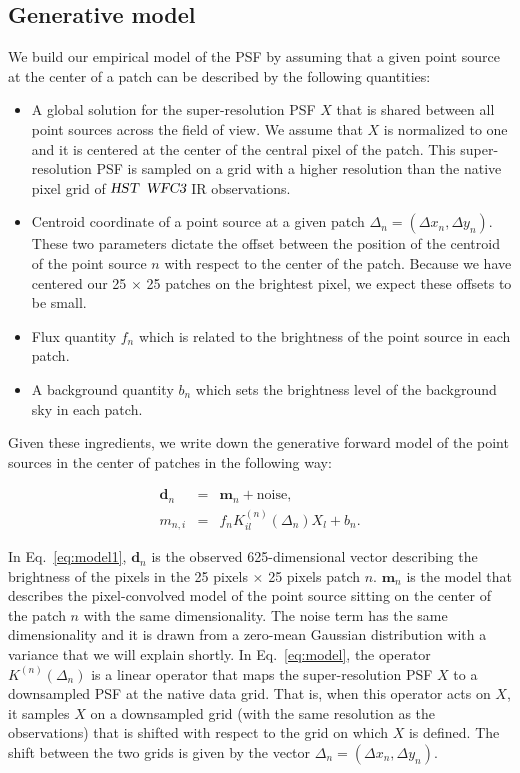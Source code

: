 \subsection{Generative model}

We build our empirical model of the PSF by assuming that a given point source at the center of a patch can be described by 
the following quantities: 

\begin{itemize}
\item A global solution for the super-resolution PSF $X$ that is shared between all point sources across the field of view. We assume 
that $X$ is normalized to one and it is centered at the center of the central pixel of the patch. This super-resolution PSF is sampled on 
a grid with a higher resolution than the native pixel grid of ${\textsl{HST}}$ ${\textsl{WFC3}}$ IR observations.

\item Centroid coordinate of a point source at a given patch $\Delta_n = (\Delta x_n, \Delta y_n)$. 
These two parameters dictate the offset between the position of the centroid of the point source $n$ with 
respect to the center of the patch. Because we have centered our 25 $\times$ 25 patches on the brightest pixel, we expect these offsets to be small.

\item Flux quantity $f_n$ which is related to the brightness of the point source in each patch.

\item A background quantity $b_n$ which sets the brightness level of the background sky in each patch.

\end{itemize}

Given these ingredients, we write down the generative forward model of the point sources in the center of patches in the following way:

\begin{eqnarray} \mathbf{d}_{n} &=& \mathbf{m}_{n} + \mathrm{noise}, \label{eq:model1} \\
       m_{n,i} &=& f_{n}K^{(n)}_{il} (\Delta_n) X_{l} + b_{n}. 
\label{eq:model}
\end{eqnarray} 

In Eq.~\ref{eq:model1}, $\mathbf{d}_{n}$ is the observed 625-dimensional vector describing the brightness of the pixels in the 25 pixels $\times$ 25 pixels patch $n$. 
$\mathbf{m}_{n}$ is the model that describes the pixel-convolved model of the point source sitting on the center of the patch $n$ with the same dimensionality. The 
noise term has the same dimensionality and it is drawn from a zero-mean Gaussian distribution with a variance that we will explain shortly.
In Eq.~\ref{eq:model}, the operator $K^{(n)}(\Delta_n)$ is a linear operator that maps the super-resolution PSF $X$ to a downsampled PSF at the native 
data grid. That is, when this operator acts on $X$, it samples $X$ on a downsampled grid (with the same resolution as the observations) 
that is shifted with respect to the grid on which $X$ is defined. The shift between the two grids is given by the vector $\Delta_n = (\Delta x_n , \Delta y_n)$.


